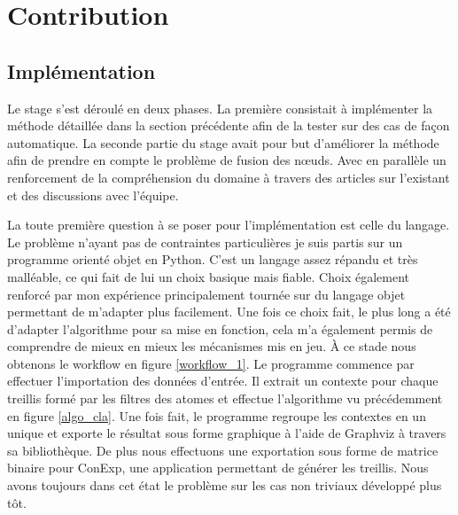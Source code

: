 \chapter{Contribution}

\section{Implémentation}

Le stage s'est déroulé en deux phases. La première consistait à implémenter la méthode détaillée dans la section précédente afin de la tester sur des cas de façon automatique. La seconde partie du stage avait pour but d'améliorer la méthode afin de prendre en compte le problème de fusion des n\oe uds. Avec en parallèle un renforcement de la compréhension du domaine à travers des articles sur l'existant et des discussions avec l'équipe.

\bigbreak

La toute première question à se poser pour l'implémentation est celle du langage. Le problème n'ayant pas de contraintes particulières je suis partis sur un programme orienté objet en Python. C'est un langage assez répandu et très malléable, ce qui fait de lui un choix basique mais fiable. Choix également renforcé par mon expérience principalement tournée sur du langage objet permettant de m'adapter plus facilement. Une fois ce choix fait, le plus long a été d'adapter l'algorithme pour sa mise en fonction, cela m'a également permis de comprendre de mieux en mieux les mécanismes mis en jeu. À ce stade nous obtenons le workflow en figure \ref{workflow_1}. Le programme commence par effectuer l'importation des données d'entrée. Il extrait un contexte pour chaque treillis formé par les filtres des atomes et effectue l'algorithme vu précédemment en figure \ref{algo_cla}. Une fois fait, le programme regroupe les contextes en un unique et exporte le résultat sous forme graphique à l'aide de Graphviz\cite{doc_graphviz} à travers sa bibliothèque\cite{doc_python_graphviz}. De plus nous effectuons une exportation sous forme de matrice binaire pour ConExp\cite{conexp}, une application permettant de générer les treillis. Nous avons toujours dans cet état le problème sur les cas non triviaux développé plus tôt.

